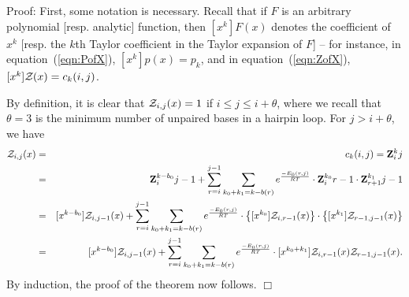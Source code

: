 \noindent
{\sc Proof:}
First, some notation is necessary. Recall that if $F$ is an arbitrary
polynomial [resp. analytic] function, then $[x^k] F(x)$
denotes the coefficient of $x^k$ [resp. the $k$th Taylor coefficient in the
Taylor expansion of $F$] -- for instance, in equation~(\ref{eqn:PofX}),
$[x^k]p(x) = p_k$, and in equation~(\ref{eqn:ZofX}), $[x^k]{\mathcal Z}_{}(x) = c_k(i,j)$.

By definition, it is clear that ${\mathcal Z}_{i,j}(x)=1$ if $i\leq j \leq i+\theta$,
where we recall that $\theta = 3$ is the minimum number of unpaired bases in
a hairpin loop.  For $j>i+\theta$, we have
\begin{eqnarray*}
[x^k] \emZ{i,j} &=& c_k(i,j) = \bfZ{k}{i}{j}\\
&=&\bfZ{k-b_0}{i}{j-1} + \sum_{r=i}^{j-1} \sum_{k_0+k_1 = k-b(r)}
e^{\frac{-E_0(r,j)}{RT}} \cdot \bfZ{k_0}{i}{r-1} \cdot \bfZ{k_1}{r+1}{j-1} \\
&=&
[x^{k-b_0}] \emZ{i,j-1} +
\sum_{r=i}^{j-1} \sum_{k_0+k_1 = k-b(r)}
e^{\frac{-E_0(r,j)}{RT}} \cdot \left\{ [x^{k_0}] \emZ{i,r-1} \right\} \cdot
\left\{ [x^{k_1}] \emZ{r-1,j-1} \right\} \\
&=&
[x^{k-b_0}] \emZ{i,j-1} +
\sum_{r=i}^{j-1} \sum_{k_0+k_1 = k-b(r)}
e^{\frac{-E_0(r,j)}{RT}} \cdot [x^{k_0+k_1}] \emZ{i,r-1} \emZ{r-1,j-1} .\\
\end{eqnarray*}
By induction, the proof of the theorem now follows. $\Box$
\medskip

